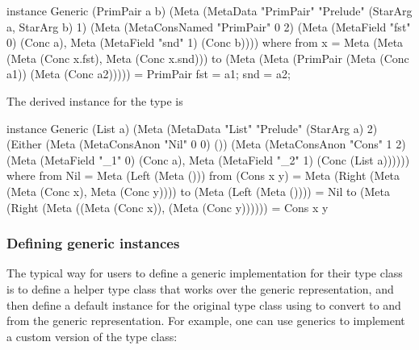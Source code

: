 \begin{libverbatim}
   instance Generic (PrimPair a b)
      (Meta (MetaData "PrimPair" "Prelude" (StarArg a, StarArg b) 1)
      (Meta (MetaConsNamed "PrimPair" 0 2)
      (Meta (MetaField "fst" 0) (Conc a),
         Meta (MetaField "snd" 1) (Conc b)))) where
   from x = Meta (Meta (Meta (Conc x.fst), Meta (Conc x.snd)))
   to (Meta (Meta (PrimPair (Meta (Conc a1)) (Meta (Conc a2))))) = 
      PrimPair { fst = a1; snd = a2; }
\end{libverbatim}

The derived  instance for the  type is

\begin{libverbatim}
   instance Generic (List a)
      (Meta (MetaData "List" "Prelude" (StarArg a) 2)
      (Either (Meta (MetaConsAnon "Nil" 0 0) ())
      (Meta (MetaConsAnon "Cons" 1 2)
         (Meta (MetaField "_1" 0) (Conc a),
         Meta (MetaField "_2" 1) (Conc (List a)))))) where
   from Nil = Meta (Left (Meta ()))
   from (Cons x y) =
      Meta (Right (Meta (Meta (Conc x), Meta (Conc y))))
   to (Meta (Left (Meta ()))) = Nil
   to (Meta (Right (Meta ((Meta (Conc x)), (Meta (Conc y)))))) = Cons x y
\end{libverbatim}

\subsubsection{Defining generic instances}

The typical way for users to define a generic implementation for their type class is to define a helper type class
that works over the generic representation, and then define a default instance for the original type class
using  to convert to and from the generic representation.  
For example, one can use generics to implement a custom version of the  type class:

